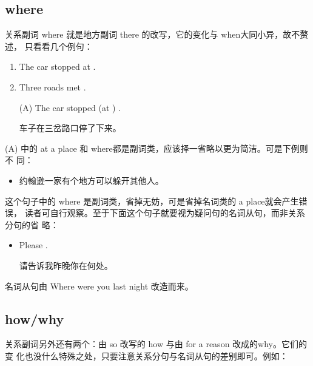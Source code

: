 \subsection{where}

关系副词 where 就是地方副词 there 的改写，它的变化与 when大同小异，故不赘述，
只看看几个例句：

\begin{enumerate}
\item The car stopped at .
\item Three roads met .

\reitem\label{3road} (A) The car stopped (at ) .

车子在三岔路口停了下来。
\end{enumerate}
(A) 中的 at a place 和 where都是副词类，应该择一省略以更为简洁。可是下例则不
同：
\begin{itemize}
\item {}  

  约翰逊一家有个地方可以躲开其他人。
\end{itemize}
这个句子中的 where 是副词类，省掉无妨，可是省掉名词类的 a place就会产生错误，
读者可自行观察。至于下面这个句子就要视为疑问句的名词从句，而非关系分句的省
略：

\begin{itemize}
\item Please   .

  请告诉我昨晚你在何处。
\end{itemize}
名词从句由 Where were you last night 改造而来。

\subsection{how/why}

关系副词另外还有两个：由 so 改写的 how 与由 for a reason 改成的why。它们的变
化也没什么特殊之处，只要注意关系分句与名词从句的差别即可。例如：

